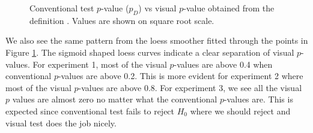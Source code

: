 \documentclass[12pt]{article}
\newcommand{\hh}[1]{{\color{orange} #1}} %
\begin{document}
\begin{figure}[hbtp]
   \centering
       \caption{Conventional test $p$-value ($p_D$) vs visual $p$-value obtained from the definition . Values are shown on square root scale. }
       \label{fig:pval_definition}
\end{figure}

We also see the same pattern from the loess smoother fitted through the points in Figure \ref{fig:pval_definition}. The sigmoid shaped loess curves indicate a clear separation of visual $p$-values. For experiment 1, most of the visual $p$-values are above 0.4 when conventional $p$-values are above 0.2. This is more evident for experiment 2 where most of the visual $p$-values are above 0.8. For experiment 3, we see all the visual $p$ values are almost zero no matter what the conventional $p$-values are. This is expected since conventional test fails to reject $H_0$ where we should reject and visual test does the job nicely.

\end{document}

